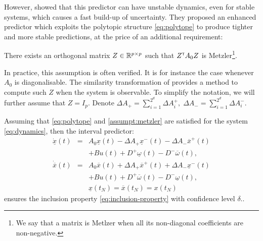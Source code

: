 \documentclass{article}
\begin{document}
However, \citet{leurent2019interval} showed that this predictor can have unstable dynamics, even for stable systems, which causes a fast build-up of uncertainty. They proposed an enhanced predictor which exploits the polytopic structure \eqref{eq:polytope} to produce tighter and more stable predictions, at the price of an additional requirement:

\begin{assumption}
\label{assumpt:metzler}
There exists an orthogonal matrix $Z\in\mathbb{R}^{p\times p}$ such that $Z^{\mathsf{\scriptscriptstyle T}} A_0 Z$ is Metzler\footnote{We say that a matrix is Metlzer when all its non-diagonal coefficients are non-negative.}.
\end{assumption}
In practice, this assumption is often verified. It is for instance the case whenever $A_0$ is diagonalisable. The similarity transformation of \citep{Efimov2013} provides a method to compute such $Z$ when the system is observable. To simplify the notation, we will further assume that $Z = I_p$. Denote $
\Delta A_{+}=\sum_{i=1}^{2^d}\Delta A_{i}^{+},\;\Delta A_{-}=\sum_{i=1}^{2^d}\Delta A_{i}^{-}$.

\begin{proposition}
\label{thm:predictor}
Assuming that \eqref{eq:polytope} and \autoref{assumpt:metzler} are satisfied for the system \eqref{eq:dynamics}, then the interval predictor:
\begin{eqnarray}
\dot{\underline{x}}(t) & = & A_{0}\underline{x}(t)-\Delta A_{+}\underline{x}^{-}(t)-\Delta A_{-}\overline{x}^{+}(t)\nonumber \\
 &  & +Bu(t)+D^{+}\underline{\omega}(t)-D^{-}\overline{\omega}(t),\nonumber\\
\dot{\overline{x}}(t) & = & A_{0}\overline{x}(t)+\Delta A_{+}\overline{x}^{+}(t)+\Delta A_{-}\underline{x}^{-}(t) \label{eq:interval-predictor} \\
 &  & +Bu(t)+D^{+}\overline{\omega}(t)-D^{-}\underline{\omega}(t),\nonumber \\
 &  & \underline{x}(t_N)=\overline{x}(t_N)={x}(t_N)\nonumber 
\end{eqnarray}
ensures the inclusion property \eqref{eq:inclusion-property} with confidence level $\delta$..
\end{proposition}
\end{document}
